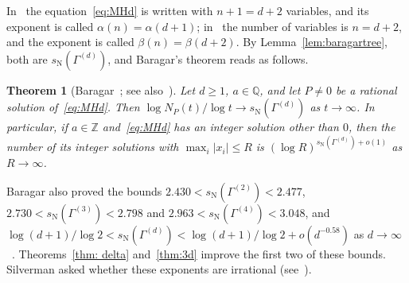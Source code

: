\documentclass[11pt]{amsart}
\newtheorem{lettertheorem}{Theorem}%
\theoremstyle{definition}
\theoremstyle{remark}
\newcommand{\Z}{\mathbb Z}
\newcommand{\sN}{s_{\mathrm N}}
\newcommand{\abs}[1]{\lvert #1\rvert}
\begin{document}
In~\cite{Bar98} the equation~\eqref{eq:MHd} is written with $n+1=d+2$ variables, and its exponent is called $\alpha(n)=\alpha(d+1)$; in~\cite{GMR19} the number of variables is $n=d+2$, and the exponent is called $\beta(n)=\beta(d+2)$. By Lemma~\ref{lem:baragartree}, both are $\sN(\Gamma^{(d)})$, and Baragar's theorem reads as follows.

\begin{lettertheorem}[Baragar~{\cite[Thm.~0.1]{Bar98}}; see also~{\cite[Thm.~2]{GMR19}}]\label{thm:baragar}
Let $d\ge1$, $a\in\mathbb Q$, and let $P\neq0$ be a rational solution of~\eqref{eq:MHd}. Then $\log N_P(t)/\log t\to\sN(\Gamma^{(d)})$ as $t\to\infty$. In particular, if $a\in\Z$ and~\eqref{eq:MHd} has an integer solution other than $0$, then the number of its integer solutions with $\max_i\abs{x_i}\le R$ is $(\log R)^{\sN(\Gamma^{(d)})+o(1)}$ as $R\to\infty$.
\end{lettertheorem}

Baragar also proved the bounds $2.430<\sN(\Gamma^{(2)})<2.477$, $2.730<\sN(\Gamma^{(3)})<2.798$ and $2.963<\sN(\Gamma^{(4)})<3.048$, and $\log(d+1)/\log2<\sN(\Gamma^{(d)})<\log(d+1)/\log2+o(d^{-0.58})$ as $d\to\infty$~\cite[Thm.~0.1 and Table~1]{Bar98}. Theorems~\ref{thm: delta} and~\ref{thm:3d} improve the first two of these bounds. Silverman asked whether these exponents are irrational (see~\cite[p.~753]{GMR19}).
\end{document}
